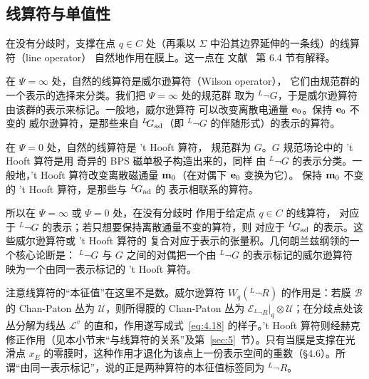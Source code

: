 

\subsection{线算符与单值性}
\label{sec:4.5}

在没有分歧时，支撑在点
$q\in C$ 处（再乘以 $\Sigma$ 中沿其边界延伸的一条线）的线算符（line operator）
自然地作用在膜上。这一点在
文献~\cite{ref8} 第 6.4 节有解释。

在 $\Psi=\infty$ 处，自然的线算符是威尔逊算符（Wilson operator），
它们由规范群的一个表示的选择来分类。我们把 $\Psi=\infty$ 处的规范群
取为 $^L\neg
G$，于是威尔逊算符由该群的表示来标记。一般地，威尔逊算符
可以改变离散电通量 ${\bf e}_0$。保持 ${\bf e}_0$ 不变的
威尔逊算符，是那些来自 $^L\neg G_\ad$（即 $^L\neg G$ 的伴随形式）的表示的算符。

在 $\Psi=0$ 处，自然的线算符是 't Hooft 算符，
规范群为 $G$。$G$ 规范场论中的 't Hooft 算符是用
奇异的 BPS 磁单极子构造出来的，同样
由 $^L\neg G$ 的表示分类。一般地，'t Hooft
算符改变离散磁通量 ${\bf m}_0$（在对偶下 ${\bf e}_0$ 变换为它）。
保持 ${\bf m}_0$ 不变的 't Hooft
算符，是那些与 $^L\neg G_{\rm ad}$ 的
表示相联系的算符。

所以在 $\Psi=\infty$ 或 $\Psi=0$ 处，在没有分歧时
作用于给定点 $q\in C$ 的线算符，
对应于 $^L\neg G$ 的表示；若只想要保持离散通量不变的算符，则
对应于 $^L\neg G_\ad$ 的表示。这些威尔逊算符或 't Hooft 算符的
复合对应于表示的张量积。几何朗兰兹纲领的一个核心论断是：
$^L\neg G$ 与 $G$ 之间的对偶把一个由 $^L\neg G$ 的表示标记的威尔逊算符
映为一个由同一表示标记的 't Hooft 算符。

\begin{yizhu}[易错点]注意线算符的“本征值”在这里不是数。威尔逊算符 $W_q({}^L\neg R)$ 的作用是：若膜 $\mathcal B$ 的 Chan-Paton 丛为 $\mathcal U$，则所得膜的 Chan-Paton 丛为 $\mathcal E_{{}^L\neg R}|_q\otimes\mathcal U$；在分歧点处该丛分解为线丛 $\mathcal L^v$ 的直和，作用遂写成式~\eqref{eq:4.18} 的样子。't Hooft 算符则经赫克修正作用（见本小节末“与线算符的关系”及第~\ref{sec:5}~节）。只有当膜是支撑在光滑点 $x_E$ 的零膜时，这种作用才退化为该点上一份表示空间的重数（§4.6）。所谓“由同一表示标记”，说的正是两种算符的本征值标签同为 $^L\neg R$。\end{yizhu}

